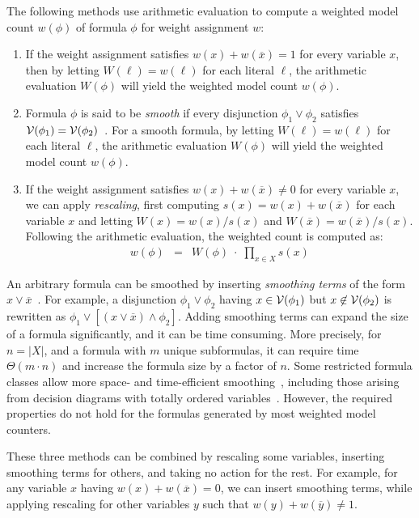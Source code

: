 \documentclass[
hf
]{ceurart}
\newcommand{\obar}[1]{\overline{#1}}
\newcommand{\lit}{\ell}
\newcommand{\varset}{X}
\newcommand{\dependencyset}{{\cal V}}
\begin{document}
The following methods use arithmetic evaluation to compute a weighted model count $w(\phi)$ of formula $\phi$ for weight assignment $w$:
\begin{enumerate}
\item If the weight assignment satisfies $w(x) + w(\obar{x}) = 1$  for every variable $x$,
  then by letting $W(\lit) = w(\lit)$ for each literal $\lit$, the arithmetic evaluation $W(\phi)$ will yield the weighted model count $w(\phi)$.
\item Formula $\phi$ is said to be \emph{smooth} if every disjunction $\phi_1 \lor \phi_2$ satisfies
  $\dependencyset(\phi_1) = \dependencyset(\phi_2)$~\cite{darwiche:jair:2002,darwiche:jancl:2001}.  For a smooth formula, 
by letting $W(\lit) = w(\lit)$ for each literal $\lit$, the arithmetic evaluation $W(\phi)$ will yield the weighted model count $w(\phi)$.
\item If the weight assignment satisfies $w(x) + w(\obar{x}) \not = 0$ for every variable $x$,
  we can apply \emph{rescaling}, first computing $s(x) = w(x) + w(\obar{x})$ for each variable $x$
  and letting $W(x) = w(x)/s(x)$ and $W(\obar{x}) = w(\obar{x})/s(x)$.  
  Following the arithmetic evaluation, the weighted count is computed as:
  \begin{eqnarray}
w(\phi) &=& W(\phi)\; \cdot \;  \prod_{x\in\varset} s(x)  \label{eqn:rescale}
  \end{eqnarray}
\end{enumerate}

An arbitrary formula can be smoothed by inserting \emph{smoothing terms} of the form $x \lor \obar{x}$~\cite{darwiche:jancl:2001}.
For example,
  a disjunction $\phi_1 \lor \phi_2$ having $x \in \dependencyset(\phi_1)$ but
  $x \not\in \dependencyset(\phi_2)$ is rewritten as $\phi_1 \lor [(x \lor \obar{x}) \land \phi_2]$.
  Adding smoothing terms can expand the size of a formula significantly, and it can be time consuming.
  More precisely, for $n = |X|$, and a formula with $m$ unique subformulas, it can require time $\Theta(m\cdot n)$ and increase the formula size by a factor of $n$.
  Some restricted formula classes allow more space- and time-efficient smoothing~\cite{shih:neurips:2019}, including those arising from decision
  diagrams with totally ordered variables~\cite{bryant:ieeetc:1986,minato:sttt:2001}.
  However, the required properties do not hold for the formulas generated by most weighted model counters.
  
  These three methods can be combined by rescaling some variables,
  inserting smoothing terms for others, and taking no action for the rest.
  For example,
  for any variable $x$ having $w(x) + w(\obar{x}) = 0$, we can insert
  smoothing terms, while applying rescaling for other variables $y$ such that $w(y) + w(\obar{y}) \not= 1$.
\end{document}
